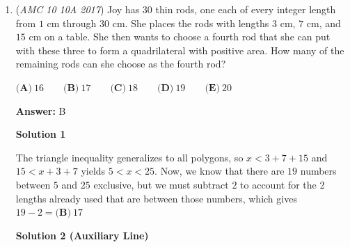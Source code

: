 \begin{enumerate}
\textbf{Solution}

The distance from town $A$ to town $B$ is $10$ km uphill, and since Minnie rides uphill at a speed of $5$ kph, it will take her $2$ hours. Next, she will ride from town $B$ to town $C$, a distance of $15$ km all downhill. Since Minnie rides downhill at a speed of $30$ kph, it will take her half an hour. Finally, she rides from town $C$ back to town $A$, a flat distance of $20$ km. Minnie rides on a flat road at $20$ kph, so this will take her $1$ hour. Her entire trip takes her $3.5$ hours.

 Then, Penny will go from town $A$ to town $C$, a flat distance of $20$ km. Since Penny rides on a flat road at $30$ kph, it will take her $\frac{2}{3}$ of an hour. Next Penny will go from town $C$ to town $B$, which is uphill for Penny. Since Penny rides at a speed of $10$ kph uphill, and town $C$ and $B$ are $15$ km apart, it will take her $1.5$ hours. Finally, Penny goes from Town $B$ back to town $A$, a distance of $10$ km downhill. Since Penny rides downhill at $40$ kph, it will only take her $\frac{1}{4}$ of an hour. In total, it takes her $29/12$ hours, which simplifies to $2$ hours and $25$ minutes.Finally, Penny's $2$hr $25$min trip was $\boxed{\textbf{(C)}\ 65}$ minutes less than Minnie's $3$hr $30$min trip.

 


	\item (\textit{AMC 10 10A 2017}) Joy has $30$ thin rods, one each of every integer length from $1$ cm through $30$ cm. She places the rods with lengths $3$ cm, $7$ cm, and $15$ cm on a table. She then wants to choose a fourth rod that she can put with these three to form a quadrilateral with positive area. How many of the remaining rods can she choose as the fourth rod?


 $\textbf{(A)}\ 16\qquad\textbf{(B)}\ 17\qquad\textbf{(C)}\ 18\qquad\textbf{(D)}\ 19\qquad\textbf{(E)}\ 20$

 \textbf{Answer: }B



\textbf{Solution 1}

The triangle inequality generalizes to all polygons, so $x < 3+7+15$ and $15<x+3+7$ yields $5<x<25$. Now, we know that there are $19$ numbers between $5$ and $25$ exclusive, but we must subtract $2$ to account for the 2 lengths already used that are between those numbers, which gives $19-2=\boxed{\textbf{(B)}\ 17}$




\textbf{Solution 2 (Auxiliary Line)}


\end{enumerate}
